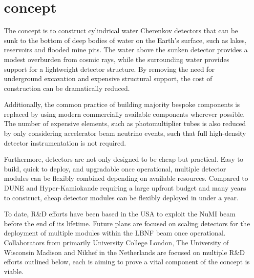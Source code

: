 \section{\chips concept} %
\label{sec:chips_concept} %

The \chips concept is to construct cylindrical water Cherenkov detectors that can be sunk to the
bottom of deep bodies of water on the Earth's surface, such as lakes, reservoirs and flooded mine
pits. The water above the sunken detector provides a modest overburden from cosmic rays, while the
surrounding water provides support for a lightweight detector structure. By removing the need for
underground excavation and expensive structural support, the cost of construction can be
dramatically reduced.

Additionally, the common practice of building majority bespoke components is replaced by using
modern commercially available components wherever possible. The number of expensive elements, such
as photomultiplier tubes is also reduced by only considering accelerator beam neutrino events,
such that full high-density detector instrumentation is not required.

Furthermore, \chips detectors are not only designed to be cheap but practical. Easy to build,
quick to deploy, and upgradable once operational, multiple detector modules can be flexibly
combined depending on available resources. Compared to DUNE and Hyper-Kamiokande requiring a large
upfront budget and many years to construct, cheap \chips detector modules can be flexibly deployed
in under a year.

To date, \chips R\&D efforts have been based in the USA to exploit the NuMI beam before the end of
its lifetime. Future plans are focused on scaling \chips detectors for the deployment of multiple
modules within the LBNF beam once operational. Collaborators from primarily University College
London, The University of Wisconsin Madison and Nikhef in the Netherlands are focused on multiple
R\&D efforts outlined below, each is aiming to prove a vital component of the \chips concept is
viable.

